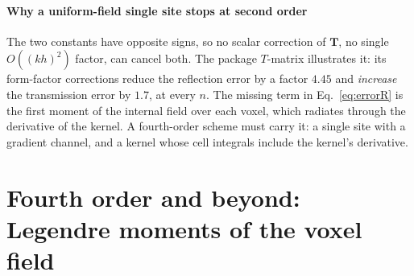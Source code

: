 \documentclass[preprint,review,12pt]{elsarticle}
\newcommand{\bT}{\mathbf{T}}
\begin{document}
\paragraph{Why a uniform-field single site stops at second order} The two constants have opposite
signs, so no scalar correction of $\bT$, no single $O((kh)^2)$ factor, can cancel both. The
package $T$-matrix illustrates it: its form-factor corrections reduce the reflection error by a
factor $4.45$ and \emph{increase} the transmission error by $1.7$, at every $n$. The missing term in
Eq.~\eqref{eq:errorR} is the first moment of the internal field over each voxel, which radiates
through the derivative of the kernel. A fourth-order scheme must carry it: a single site with a
gradient channel, and a kernel whose cell integrals include the kernel's derivative.

\section{Fourth order and beyond: Legendre moments of the voxel field}\label{sec:fourth}
\end{document}
